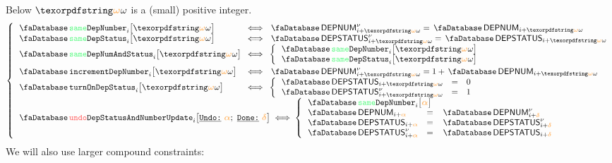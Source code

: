 Below $\relof$ is a (small) positive integer.
\[
	\left\{ \begin{array}{lcl}
		\accSameDeploymentNumber  {i}{\relof} & \!\!\! \iff \!\!\! & \accDeploymentNumber\new_{i + \relof} = \accDeploymentNumber_{i + \relof} \\
		\accSameDeploymentStatus  {i}{\relof} & \!\!\! \iff \!\!\! & \accDeploymentStatus\new_{i + \relof} = \accDeploymentStatus_{i + \relof} \\
		\accSameDeployment        {i}{\relof} & \!\!\! \iff \!\!\! &
		\left\{ \begin{array}{lcl}
			\multicolumn{3}{l}{\accSameDeploymentNumber {i}{\relof} } \\
			\multicolumn{3}{l}{\accSameDeploymentStatus {i}{\relof} } \\
		\end{array} \right. \vspace{1mm} \\
		\accIncrementDeploymentNumber  {i}{\relof} & \!\!\! \iff \!\!\! & \accDeploymentNumber\new_{i + \relof} = 1 + \accDeploymentNumber_{i + \relof} \\
		\accTurnOnDepStatus            {i}{\relof} & \!\!\! \iff \!\!\! &
		\left\{ \begin{array}{lcl}
			\accDeploymentStatus      _{i + \relof} & = & 0 \\
			\accDeploymentStatus\new  _{i + \relof} & = & 1 \\
		\end{array} \right. \\
		\multicolumn{3}{l}{
			\accUndoDeploymentStatusAndNumberUpdate {i}{\reluo}{\reldo} \iff
			\left\{ \begin{array}{lcl}
				\multicolumn{3}{l}{\accSameDeploymentNumber {i}{\reluo}} \\
				\accDeploymentNumber   _{i + \reluo} & = & \accDeploymentNumber\new   _{i + \reldo} \\
				\accDeploymentStatus          _{i + \reluo} & = & \accDeploymentStatus\new   _{i + \reldo} \\
				\accDeploymentStatus\new      _{i + \reluo} & = & \accDeploymentStatus       _{i + \reldo} \\
			\end{array} \right. } \\
	\end{array} \right.
\]
We will also use larger compound constraints:
